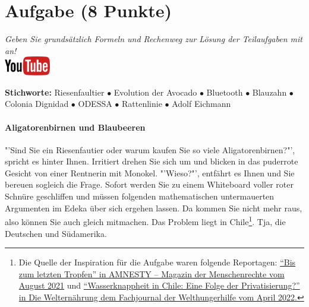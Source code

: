 \documentclass[a4paper, 9pt]{scrartcl}\usepackage[]{graphicx}\usepackage[]{xcolor}
\begin{document}
 
\clearpage

\section{Aufgabe \hfill (8 Punkte)}

\textit{Geben Sie grunds{\"a}tzlich Formeln und Rechenweg zur L{\"o}sung der
  Teilaufgaben mit an!} \\[1Ex]

\hfill\href{https://youtu.be/https://youtu.be/k2G52hMIfqk}{\includegraphics[width = 2cm]{img/youtube}} %
\hspace{2Ex}

{\tiny\textbf{Stichworte:} Riesenfaultier $\bullet$ Evolution der Avocado $\bullet$ Bluetooth $ \bullet$ Blauzahn $\bullet$ Colonia Dignidad $\bullet$ ODESSA $\bullet$ Rattenlinie $\bullet$ Adolf Eichmann}


\paragraph{Aligatorenbirnen und Blaubeeren}



"'Sind Sie ein Riesenfautier oder warum kaufen Sie so viele
Aligatorenbirnen?"', spricht es hinter Ihnen. Irritiert drehen Sie sich um
und blicken in das puderrote Gesicht von einer Rentnerin mit Monokel. "'Wieso?"', entfährt es
Ihnen und Sie bereuen sogleich die Frage. Sofort werden Sie zu einem
Whiteboard voller roter Schnüre geschliffen und müssen folgenden
mathematischen untermauerten Argumenten im Edeka über sich ergehen
lassen. Da kommen Sie nicht mehr raus, also können Sie auch gleich
mitmachen. Das Problem liegt in Chile\footnote{Die Quelle der Inspiration
  für die Aufgabe waren folgende Reportagen:
  \href{https://www.amnesty.ch/de/ueber-amnesty/publikationen/magazin-amnesty/2021-3/bis-zum-letzten-tropfen}{"`Bis
  zum letzten Tropfen"' in AMNESTY – Magazin der Menschenrechte vom August
  2021} und
\href{https://www.welthungerhilfe.de/welternaehrung/rubriken/klima-ressourcen/wassernot-in-chile-eine-folge-der-privatisierung}{"`Wasserknappheit
  in Chile: Eine Folge der Privatisierung?"' in Die Welternährung dem
  Fachjournal der Welthungerhilfe vom April 2022.}}. Tja, die Deutschen und Südamerika.\\
\end{document}
